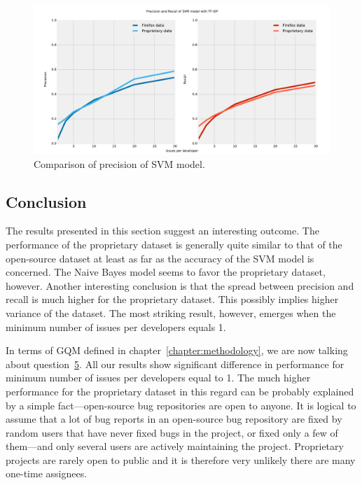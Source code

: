 \begin{figure}[htbp]
    \centering
        \includegraphics[width=\textwidth]{./images/prop_vs_os/svm_precision_and_recall.pdf}
    \caption{Comparison of precision of SVM model.}
    \label{fig:results.datasets.svm_pr}
\end{figure}

\subsection{Conclusion}

The results presented in this section suggest an interesting outcome. The performance of the proprietary dataset is generally quite similar to that of the open-source dataset at least as far as the accuracy of the SVM model is concerned. The Naive Bayes model seems to favor the proprietary dataset, however. Another interesting conclusion is that the spread between precision and recall is much higher for the proprietary dataset. This possibly implies higher variance of the dataset. The most striking result, however, emerges when the minimum number of issues per developers equals 1.

In terms of GQM defined in chapter~\ref{chapter:methodology}, we are now talking about question~\hyperlink{question:5}{5}. All our results show significant difference in performance for minimum number of issues per developers equal to 1. The much higher performance for the proprietary dataset in this regard can be probably explained by a simple fact---open-source bug repositories are open to anyone. It is logical to assume that a lot of bug reports in an open-source bug repository are fixed by random users that have never fixed bugs in the project, or fixed only a few of them---and only several users are actively maintaining the project. Proprietary projects are rarely open to public and it is therefore very unlikely there are many one-time assignees.

